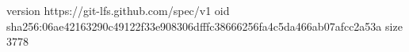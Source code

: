 version https://git-lfs.github.com/spec/v1
oid sha256:06ae42163290c49122f33e908306dfffc38666256fa4c5da466ab07afcc2a53a
size 3778
